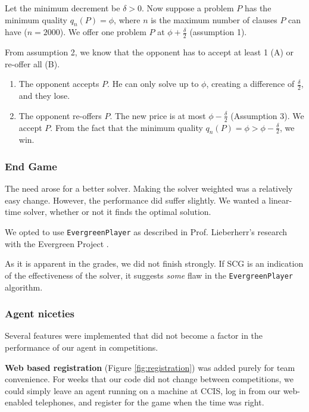 \documentclass[letterpaper,12pt,oneside]{article}
\begin{document}
Let the minimum decrement be $\delta > 0$.
Now suppose a problem $P$ has the minimum quality $q_n(P) = \phi$, where $n$
is the maximum number of clauses $P$ can have ($n = 2000$).
We offer one problem $P$ at $\phi + \frac{\delta}{2}$ (assumption 1).

From assumption 2, we know that the opponent has to accept at least 1 (A)
or re-offer all (B).

\begin{enumerate}
\renewcommand{\labelenumi}{(\Alph{enumi})}
    \item The opponent accepts $P$. He can only solve up to $\phi$,
          creating a difference of $\frac{\delta}{2}$, and they lose.
    \item The opponent re-offers $P$. The new price is at most $\phi -
          \frac{\delta}{2}$ (Assumption 3). We accept $P$. From
          the fact that the minimum quality $q_n(P) = \phi > \phi -
          \frac{\delta}{2}$, we win.
\end{enumerate}

\subsubsection{End Game}

The need arose for a better solver. Making the solver weighted was a
relatively easy change. However, the performance did suffer slightly. We
wanted a linear-time solver, whether or not it finds the optimal solution.

We opted to use {\tt EvergreenPlayer} as described in Prof. Lieberherr's
research with the Evergreen Project \cite{Evergreen:lscs-07}.

As it is apparent in the grades, we did not finish strongly. If SCG is an
indication of the effectiveness of the solver, it suggests {\em some} flaw
in the {\tt EvergreenPlayer} algorithm.

\subsubsection{Agent niceties}

Several features were implemented that did not become a factor in the
performance of our agent in competitions.

\textbf{Web based registration} (Figure \ref{fig:registration}) was added
purely for team convenience. For weeks that our code did not change between
competitions, we could simply leave an agent running on a machine at CCIS, 
log in from our web-enabled telephones, and register for the game when the time was right.
\end{document}
